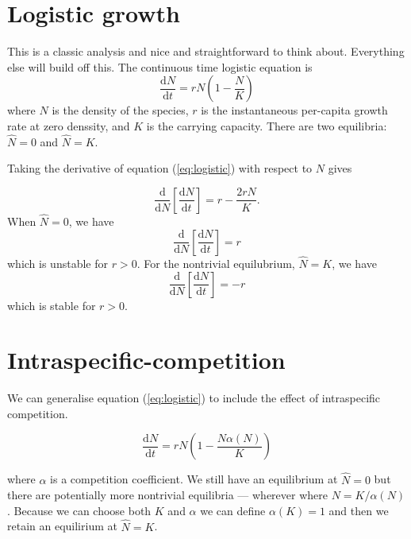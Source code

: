\documentclass[12pt,a4paper]{article}
\newcommand{\ud}{\mathrm{d}}
\begin{document}
\section{Logistic growth}

This is a classic analysis and nice and straightforward to think
about.  Everything else will build off this.  The continuous time
logistic equation is
%
\begin{equation}
  \label{eq:logistic}
  \frac{\ud N}{\ud t} = r N\left(1 - \frac{N}{K}\right)
\end{equation}
%
where $N$ is the density of the species, $r$ is the instantaneous
per-capita growth rate at zero denssity, and $K$ is the carrying
capacity.  There are two equilibria: $\hat N = 0$ and $\hat N = K$.

Taking the derivative of equation (\ref{eq:logistic}) with respect to
$N$ gives

\begin{equation}
  \label{eq:logistic-derivative}
  \frac{\ud}{\ud N}\left[\frac{\ud N}{\ud t}\right]
   = r - \frac{2 r N}{K}.
\end{equation}
%
When $\hat N = 0$, we have 
\begin{equation}
  \label{eq:logistic-derivative-trivial}
  \frac{\ud}{\ud N}\left[\frac{\ud N}{\ud t}\right]
   = r
\end{equation}
which is unstable for $r > 0$.  For the nontrivial equilubrium, $\hat
N = K$, we have
\begin{equation}
  \label{eq:logistic-derivative-nontrivial}
  \frac{\ud}{\ud N}\left[\frac{\ud N}{\ud t}\right]
   = -r
\end{equation}
which is stable for $r > 0$.

\section{Intraspecific-competition}

We can generalise equation (\ref{eq:logistic}) to include the effect
of intraspecific competition.  

\begin{equation}
  \label{eq:logistic-competition}
  \frac{\ud N}{\ud t} = r N\left(1 - \frac{N\alpha(N)}{K}\right)
\end{equation}

where $\alpha$ is a competition coefficient.  We still have an
equilibrium at $\hat N = 0$ but there are potentially more nontrivial
equilibria --- wherever where $N = K / \alpha(N)$.  Because we can
choose both $K$ and $\alpha$ we can define $\alpha(K) = 1$ and then we
retain an equilirium at $\hat N = K$.
\end{document}
